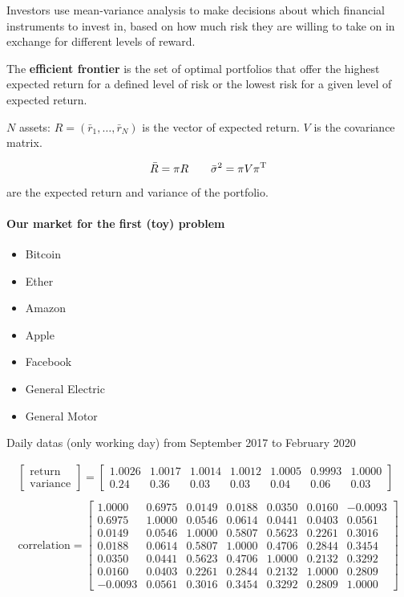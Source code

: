 Investors use mean-variance analysis to make decisions about which financial instruments to invest in, based on how much risk they are willing to take on in exchange for different levels of reward.

The \textbf{efficient frontier} is the set of optimal portfolios that offer the highest expected return for a defined level of risk or the lowest risk for a given level of expected return.


$N$ assets: $R=(\bar{r}_1,\ldots,\bar{r}_N)$ is the vector of expected return. $V$ is the covariance matrix.

\[
	\bar{R} = \pi R \qquad \bar{\sigma}^2 = \pi V \pi ^{\mathrm{T}}
\]

are the expected return and variance of the portfolio.

\paragraph{Our market for the first (toy) problem}

\begin{itemize}
	\item Bitcoin
	\item Ether
	\item Amazon
	\item Apple
	\item Facebook
	\item General Electric
	\item General Motor
\end{itemize}

Daily datas (only working day) from September 2017 to February 2020

\begin{gather*}
\begin{bmatrix}
\text{return}\\
\text{variance}
\end{bmatrix} =\begin{bmatrix}
1.0026 & 1.0017 & 1.0014 & 1.0012 & 1.0005 & 0.9993 & 1.0000\\
0.24 & 0.36 & 0.03 & 0.03 & 0.04 & 0.06 & 0.03
\end{bmatrix}\\
\\
\text{correlation} =\begin{bmatrix}
1.0000 & 0.6975 & 0.0149 & 0.0188 & 0.0350 & 0.0160 & -0.0093\\
0.6975 & 1.0000 & 0.0546 & 0.0614 & 0.0441 & 0.0403 & 0.0561\\
0.0149 & 0.0546 & 1.0000 & 0.5807 & 0.5623 & 0.2261 & 0.3016\\
0.0188 & 0.0614 & 0.5807 & 1.0000 & 0.4706 & 0.2844 & 0.3454\\
0.0350 & 0.0441 & 0.5623 & 0.4706 & 1.0000 & 0.2132 & 0.3292\\
0.0160 & 0.0403 & 0.2261 & 0.2844 & 0.2132 & 1.0000 & 0.2809\\
-0.0093 & 0.0561 & 0.3016 & 0.3454 & 0.3292 & 0.2809 & 1.0000
\end{bmatrix}
\end{gather*}

